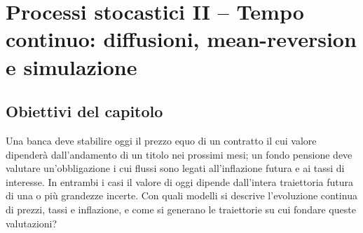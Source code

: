 



\chapter{Processi stocastici II -- Tempo continuo: diffusioni,
mean-reversion e simulazione}

\label{cap:tempo-continuo}

\section{Obiettivi del capitolo}

Una banca deve stabilire oggi il prezzo equo di un contratto il cui
valore dipender\`{a} dall'andamento di un titolo nei prossimi mesi;
un fondo pensione deve valutare un'obbligazione i cui flussi sono
legati all'inflazione futura e ai tassi di interesse. In entrambi i
casi il valore di oggi dipende dall'intera traiettoria futura di una
o pi\`{u} grandezze incerte. Con quali modelli si descrive
l'evoluzione continua di prezzi, tassi e inflazione, e come si
generano le traiettorie su cui fondare queste valutazioni?

